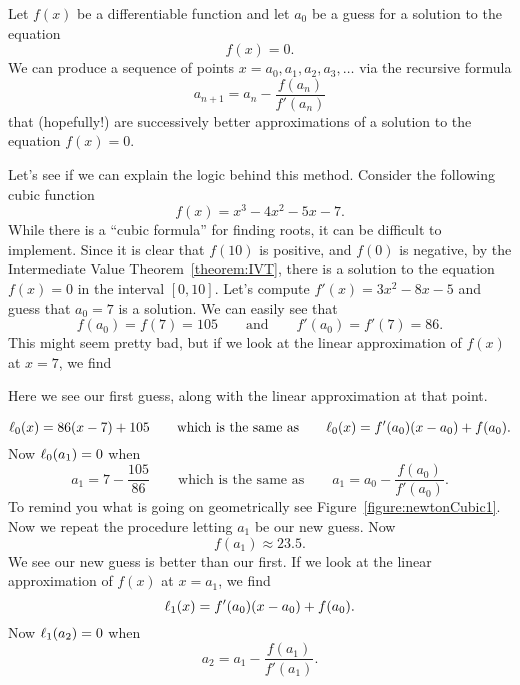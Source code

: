 \begin{newtonsMethod}
Let $f(x)$ be a differentiable function and let $a_0$ be a
guess for a solution to the equation
\[
f(x) = 0.
\]
We can produce a sequence of points $x=a_0, a_1, a_2, a_3, \dots$ via
the recursive formula
\[
a_{n+1} = a_n -\frac{f(a_n)}{f'(a_n)}
\]
that (hopefully!) are successively better approximations of a solution
to the equation $f(x) = 0$.
\end{newtonsMethod}
Let's see if we can explain the logic behind this method. Consider the
following cubic function
\[
f(x) = x^3 - 4 x^2 - 5 x - 7.
\]
While there is a ``cubic formula'' for finding roots, it can be
difficult to implement. Since it is clear that $f(10)$ is positive,
and $f(0)$ is negative, by the Intermediate Value
Theorem~\ref{theorem:IVT}, there is a solution to the equation $f(x) =
0$ in the interval $[0,10]$. Let's compute $f'(x) = 3x^2 -8x-5$ and
guess that $a_0=7$ is a solution. We can easily see that
\[
f(a_0) = f(7) = 105\qquad\text{and}\qquad f'(a_0) = f'(7) = 86.
\]
This might seem pretty bad, but if we look at the linear approximation
of $f(x)$ at $x=7$, we find
\begin{marginfigure}[-1in]
\caption{Here we see our first guess, along with the linear
  approximation at that point.}
\label{figure:newtonCubic1}
\end{marginfigure}
\[
\ell_0(x) = 86(x-7) + 105 \qquad\text{which is the same as}\qquad \ell_0(x) = f'(a_0)(x-a_0) + f(a_0).
\]
Now $\ell_0(a_1) = 0$ when
\[
a_1 = 7 - \frac{105}{86} \qquad\text{which is the same as}\qquad a_1 = a_0
-\frac{f(a_0)}{f'(a_0)}.
\]
To remind you what is going on geometrically see
Figure~\ref{figure:newtonCubic1}. Now we repeat the procedure letting
$a_1$ be our new guess. Now
\[
f(a_1) \approx 23.5.
\]
We see our new guess is better than our first. If we look at the
linear approximation of $f(x)$ at $x=a_1$, we find
\[
\ell_1(x) = f'(a_0)(x-a_0) + f(a_0).
\]
Now $\ell_1(a_2) = 0$ when
\[
a_2 = a_1 - \frac{f(a_1)}{f'(a_1)}.
\]

